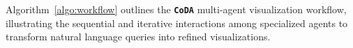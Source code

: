 \documentclass[11pt, a4paper, logo, copyright]{googlecloud}
\newcommand{\methodname}{\textbf{\texttt{\textcolor{StarIndigo}{C}\textcolor{StarIndigo}{o}\textcolor{StarCoral}{D}\textcolor{StarTeal}{A}}}}
\begin{document}
Algorithm~\ref{algo:workflow} outlines the \methodname{} multi-agent visualization workflow, illustrating the sequential and iterative interactions among specialized agents to transform natural language queries into refined visualizations.





\end{document}

